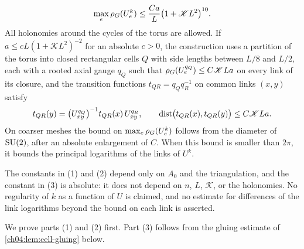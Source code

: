 \begin{lemma}
\begin{enumerate}
\[
 \max_e\rho_G(U^k_e)\le\frac{Ca}L\bigl(1+\mathscr KL^2\bigr)^{10}.
\]
All holonomies around the cycles of the torus are allowed. If $a\le cL(1+\mathscr KL^2)^{-2}$ for an absolute $c>0$, the construction uses a partition of the torus into closed rectangular cells $Q$ with side lengths between $L/8$ and $L/2$, each with a rooted axial gauge $q_Q$ such that $\rho_G(U^{q_Q}_e)\le C\mathscr KLa$ on every link of its closure, and the transition functions $t_{QR}=q_Qq_R^{-1}$ on common links $(x,y)$ satisfy
\[
 t_{QR}(y)=\bigl(U^{q_Q}_{xy}\bigr)^{-1}t_{QR}(x)\,U^{q_R}_{xy},\qquad\operatorname{dist}\bigl(t_{QR}(x),t_{QR}(y)\bigr)\le C\mathscr KLa.
\]
On coarser meshes the bound on $\max_e\rho_G(U^k_e)$ follows from the diameter of $\mathrm{SU}(2)$, after an absolute enlargement of $C$. When this bound is smaller than $2\pi$, it bounds the principal logarithms of the links of $U^k$.
\end{enumerate}
The constants in (1) and (2) depend only on $A_0$ and the triangulation, and the constant in (3) is absolute: it does not depend on $n$, $L$, $\mathscr K$, or the holonomies. No regularity of $k$ as a function of $U$ is claimed, and no estimate for differences of the link logarithms beyond the bound on each link is asserted.
\end{lemma}

We prove parts (1) and (2) first. Part (3) follows from the gluing estimate of \cref{ch04:lem:cell-gluing} below.

